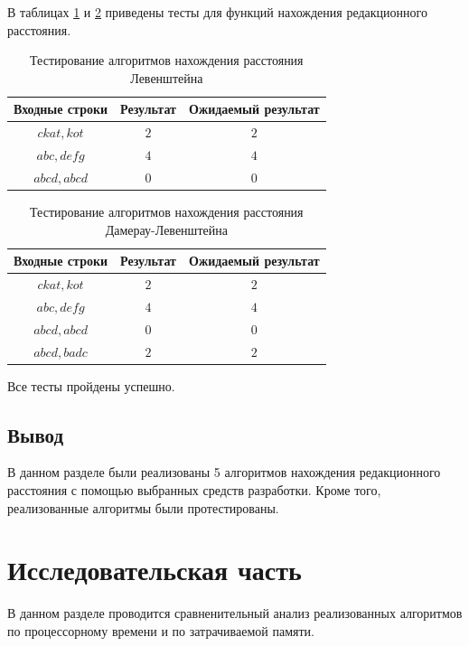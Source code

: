 \documentclass{report}
\begin{document}
В таблицах \ref{tbl:test1} и \ref{tbl:test2} приведены тесты для функций нахождения редакционного расстояния.

\begin{table}[h!p]
	\begin{center}
		\caption{\label{tbl:test1}Тестирование алгоритмов нахождения расстояния Левенштейна}
		\begin{tabular}{|c|c|c|}
			\hline
			Входные строки & Результат & Ожидаемый результат \\ 
			\hline
			$ckat, kot$ & $2$  & $2$\\\hline
			$abc, defg$  & $4$  & $4$\\\hline
			$abcd, abcd$  & $0$  & $0$\\\hline
		\end{tabular}
	\end{center}
\end{table}

\begin{table}[h!p]
	\begin{center}
		\caption{\label{tbl:test2}Тестирование алгоритмов нахождения расстояния Дамерау-Левенштейна}
		\begin{tabular}{|c|c|c|}
			\hline
			Входные строки & Результат & Ожидаемый результат \\ 
			\hline
			$ckat, kot$ & $2$  & $2$\\\hline
			$abc, defg$  & $4$  & $4$\\\hline
			$abcd, abcd$  & $0$  & $0$\\\hline
			$abcd, badc$  & $2$  & $2$\\\hline
		\end{tabular}
	\end{center}
\end{table}

Все тесты пройдены успешно.

\section{Вывод}

В данном разделе были реализованы 5 алгоритмов нахождения редакционного расстояния с помощью выбранных средств разработки. Кроме того, реализованные алгоритмы были протестированы.

\chapter{Исследовательская часть}
В данном разделе проводится сравненительный анализ реализованных алгоритмов по процессорному времени и по затрачиваемой памяти.
\end{document}
